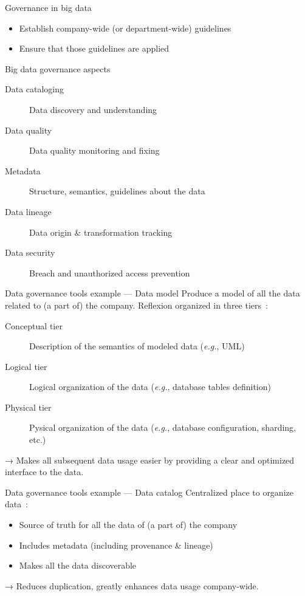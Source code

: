 \begin{frame}{Governance in big data}
  \begin{itemize}
    \item Establish company-wide (or department-wide) guidelines
    \item Ensure that those guidelines are applied
  \end{itemize}
\end{frame}

\begin{frame}{Big data governance aspects}
  \begin{description}
    \item[Data cataloging] Data discovery and understanding
    \item[Data quality] Data quality monitoring and fixing
    \item[Metadata] Structure, semantics, guidelines about the data
    \item[Data lineage] Data origin \& transformation tracking
    \item[Data security] Breach and unauthorized access prevention
  \end{description}
\end{frame}

\begin{frame}{Data governance tools example — Data model}
  Produce a model of all the data related to (a part of) the company. Reflexion organized in three tiers~:

  \begin{description}
    \item[Conceptual tier] Description of the semantics of modeled data (\textit{e.g.}, UML)
    \item[Logical tier] Logical organization of the data (\textit{e.g.}, database tables definition)
    \item[Physical tier] Pysical organization of the data (\textit{e.g.}, database configuration, sharding, etc.)
  \end{description}

  → Makes all subsequent data usage easier by providing a clear and optimized interface to the data.
\end{frame}

\begin{frame}{Data governance tools example — Data catalog}
  Centralized place to organize data~:

  \begin{itemize}
    \item Source of truth for all the data of (a part of) the company
    \item Includes metadata (including provenance \& lineage)
    \item Makes all the data discoverable
  \end{itemize}

  → Reduces duplication, greatly enhances data usage company-wide.
\end{frame}
